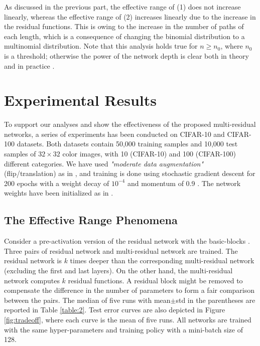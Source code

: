 \documentclass[journal]{IEEEtran}
\begin{document}
As discussed in the previous part, the effective range of (1) does not increase linearly, whereas the effective range of (2)  increases linearly due to the increase in the residual functions. This is owing to the increase in the number of  paths of each length, which is a consequence of  changing the binomial distribution to a multinomial distribution. Note that this analysis holds true for $n\geq n_0$, where $n_0$ is a threshold; otherwise the power of the network depth is clear both in theory \cite{haastad1991power,haastad1987computational,eldan2015power} and in practice \cite{krizhevsky2012imagenet,simonyan2014very,szegedy2015going}.




\section{Experimental Results}\label{sec5}

To support our analyses and show the effectiveness of the proposed multi-residual networks, a series of experiments has been conducted on CIFAR-10 and CIFAR-100 datasets.  Both datasets contain 50,000 training samples and 10,000 test samples of $32\times 32$ color images, with 10 (CIFAR-10) and 100 (CIFAR-100) different categories.   We have used \textit{"moderate data augmentation"} (flip/translation) as in \cite{he2016identity}, and training is done using stochastic gradient descent for 200 epochs with a weight decay of $10^{-4}$ and momentum of 0.9 \cite{he2015deep}. The network weights have been  initialized as in \cite{he2015delving}. %



\subsection{The Effective Range Phenomena}\label{effph}


Consider a pre-activation version of the residual network with the basic-blocks \cite{he2016identity}. Three pairs of residual network and multi-residual network are trained. The residual network is $k$ times deeper than the corresponding multi-residual network (excluding the first and last layers). On the other hand, the multi-residual network computes $k$ residual functions. A residual block might be removed to compensate the difference in the number of parameters to form a fair comparison between the pairs. The median of five runs with mean$\pm$std in the parentheses are reported in Table \ref{table:2}. Test error curves are also depicted in Figure \ref{fig:tradeoff}, where each curve is the mean of five runs. All networks are trained with the same hyper-parameters and training policy with a mini-batch size of 128.
\end{document}
